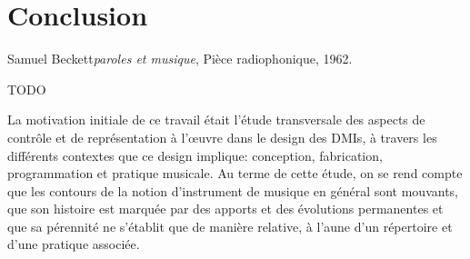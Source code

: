 %
\chapter{Conclusion}
\label{ch:conclusion}

{Samuel Beckett}{\textit{paroles et musique}, Pièce radiophonique, 1962. \cite{beckett_comeet_2014}}

TODO

\noindent La motivation initiale de ce travail était l'étude transversale des aspects de contrôle et de représentation à l'œuvre dans le design des \glspl{DMI}, à travers les différents contextes que ce design implique: conception, fabrication, programmation et pratique musicale. Au terme de cette étude, on se rend compte que les contours de la notion d'instrument de musique en général sont mouvants, que son histoire est marquée par des apports et des évolutions permanentes et que sa pérennité ne s'établit que de manière relative, à l'aune d'un répertoire et d'une pratique associée.


